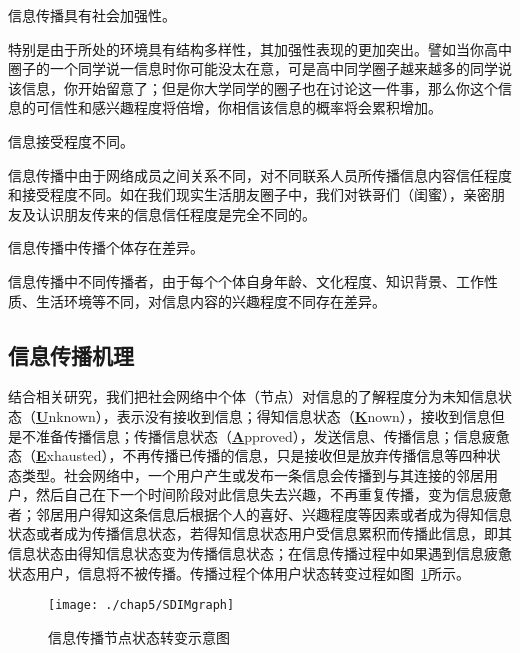 \begin{assumption}
\label{chap5:assumption3}
	信息传播具有社会加强性。%
\end{assumption}

特别是由于所处的环境具有结构多样性，其加强性表现的更加突出。譬如当你高中圈子的一个同学说一信息时你可能没太在意，可是高中同学圈子越来越多的同学说该信息，你开始留意了；但是你大学同学的圈子也在讨论这一件事，那么你这个信息的可信性和感兴趣程度将倍增，你相信该信息的概率将会累积增加。

\begin{assumption}
	\label{chap5:assumption4}
	信息接受程度不同。%
\end{assumption}

信息传播中由于网络成员之间关系不同，对不同联系人员所传播信息内容信任程度和接受程度不同。如在我们现实生活朋友圈子中，我们对铁哥们（闺蜜），亲密朋友及认识朋友传来的信息信任程度是完全不同的。
\begin{assumption}
	\label{chap5:assumption5}
	信息传播中传播个体存在差异。
\end{assumption}

信息传播中不同传播者，由于每个个体自身年龄、文化程度、知识背景、工作性质、生活环境等不同，对信息内容的兴趣程度不同存在差异。%
\subsection{信息传播机理}
结合相关研究，我们把社会网络中个体（节点）对信息的了解程度分为未知信息状态（\underline{\textbf{U}}nknown），表示没有接收到信息；得知信息状态（\underline{\textbf{K}}nown），接收到信息但是不准备传播信息；传播信息状态（\underline{\textbf{A}}pproved），发送信息、传播信息；信息疲惫态（\underline{\textbf{E}}xhausted），不再传播已传播的信息，只是接收但是放弃传播信息等四种状态类型。社会网络中，一个用户产生或发布一条信息会传播到与其连接的邻居用户，然后自己在下一个时间阶段对此信息失去兴趣，不再重复传播，变为信息疲惫者；邻居用户得知这条信息后根据个人的喜好、兴趣程度等因素或者成为得知信息状态或者成为传播信息状态，若得知信息状态用户受信息累积而传播此信息，即其信息状态由得知信息状态变为传播信息状态；在信息传播过程中如果遇到信息疲惫状态用户，信息将不被传播。传播过程个体用户状态转变过程如图~\ref{fig:SDIMgraph}所示。
\begin{figure}[H] %
	\centering
	\texttt{[image: ./chap5/SDIMgraph]}
	\caption{信息传播节点状态转变示意图}
	\label{fig:SDIMgraph}
\end{figure}

